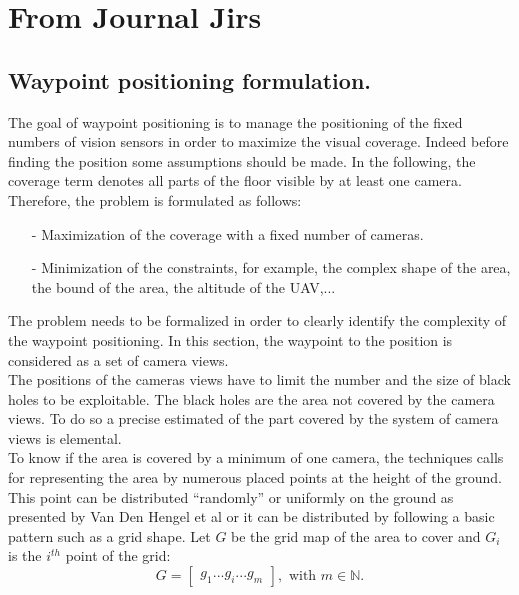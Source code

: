 \section{From Journal Jirs}
\iffalse 
\subsection{ Waypoint positioning formulation. }\label{WaypointPositiongForm}

The goal of waypoint positioning is to manage the positioning of the fixed numbers of vision sensors in order to maximize the visual coverage. Indeed before finding the position some assumptions should be made.
In the following, the coverage term denotes all parts of the floor visible by at least one camera. 
 Therefore, the problem is formulated as follows:
\begin{itemize}
\item [-] Maximization of the coverage with a fixed number of cameras.
\item [-] Minimization of the constraints, for example, the complex shape of the area, the bound of the area, the altitude of the UAV,...
\end{itemize}

The problem needs to be formalized in order to clearly identify the complexity of the waypoint positioning.
In this section, the waypoint to the position is considered as a set of camera views. \\
The positions of the cameras views have to limit the number and the size of black holes to be exploitable. The black holes are the area not covered by the camera views. 
To do so a precise estimated of the part covered by the system of camera views is elemental.
\\To know if the area is covered by a minimum of one camera, the techniques calls for representing the area by numerous placed points at the height of the ground. This point can be distributed “randomly” or uniformly on the ground as presented by Van Den Hengel et al \cite{83*} or it can be distributed by following a basic pattern  such as a grid shape.  Let $G$ be the grid map of the area to cover and $G_i$ is the $i^{th}$  point of the grid: %
\begin{equation}
G=\begin{bmatrix}
 g_1 ...g_i ... g_m
\end{bmatrix}  ,\mbox{ with }  m\in \mathbb{N}.
\end{equation}

